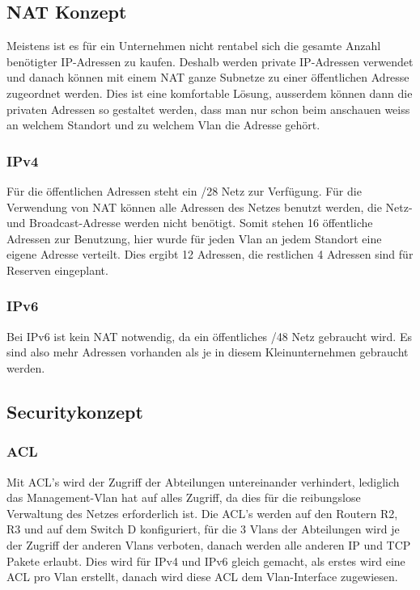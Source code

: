 \documentclass[12pt,a4paper,titlepage]{article}
\begin{document}
\subsection{NAT Konzept}
Meistens ist es für ein Unternehmen nicht rentabel sich die gesamte Anzahl benötigter IP-Adressen zu  kaufen. Deshalb werden private IP-Adressen verwendet und danach können mit einem NAT ganze Subnetze zu einer öffentlichen Adresse zugeordnet werden. Dies ist eine komfortable Lösung, ausserdem können dann die privaten Adressen so gestaltet werden, dass man nur schon beim anschauen weiss an welchem Standort und zu welchem Vlan die Adresse gehört.

\subsubsection{IPv4}
Für die öffentlichen Adressen steht ein /28 Netz zur Verfügung. Für die Verwendung von NAT können alle Adressen des Netzes benutzt werden, die Netz- und Broadcast-Adresse werden nicht benötigt. Somit stehen 16 öffentliche Adressen zur Benutzung, hier wurde für jeden Vlan an jedem Standort eine eigene Adresse verteilt. Dies ergibt 12 Adressen, die restlichen 4 Adressen sind für Reserven eingeplant.

\subsubsection{IPv6}
Bei IPv6 ist kein NAT notwendig, da ein öffentliches /48 Netz gebraucht wird. Es sind also mehr Adressen vorhanden als je in diesem Kleinunternehmen gebraucht werden.

\newpage
\subsection{Securitykonzept} 
\subsubsection{ACL}
Mit ACL's wird der Zugriff der Abteilungen untereinander verhindert, lediglich das Management-Vlan hat auf alles Zugriff, da dies für die reibungslose Verwaltung des Netzes erforderlich ist.
Die ACL's werden auf den Routern R2, R3 und auf dem Switch D konfiguriert, für die 3 Vlans der Abteilungen wird je der Zugriff der anderen Vlans verboten, danach werden alle anderen IP und TCP Pakete erlaubt. Dies wird für IPv4 und IPv6 gleich gemacht, als erstes wird eine ACL pro Vlan erstellt, danach wird diese ACL dem Vlan-Interface zugewiesen.
\end{document}
